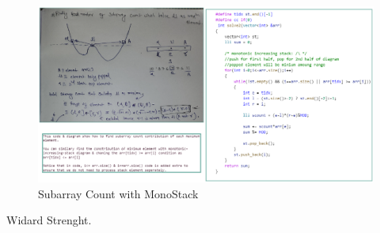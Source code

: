 \begin{fullwidth}
\begin{figure}[h]
    \caption{Subarray Count with MonoStack}
    \includegraphics[width=\dimexpr\textwidth+\marginparwidth\relax]{resources/monotonic-stack-subarray-count.jpg}
\end{figure}

\end{fullwidth}


Widard Strenght.





